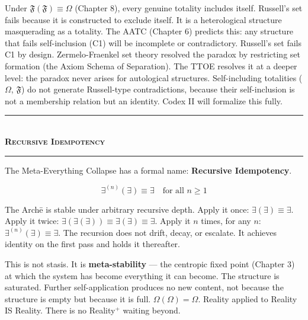 \documentclass[10pt, openany, oneside]{book}
\renewcommand{\normalsize}{\fontsize{10}{13}\selectfont}
\begin{document}
Under $\mathfrak{F}(\mathfrak{F}) \equiv \Omega$ (Chapter 8), every genuine totality includes itself. Russell's set fails because it is constructed to exclude itself. It is a heterological structure masquerading as a totality. The AATC (Chapter 6) predicts this: any structure that fails self-inclusion (C1) will be incomplete or contradictory. Russell's set fails C1 by design. Zermelo-Fraenkel set theory resolved the paradox by restricting set formation (the Axiom Schema of Separation). The TTOE resolves it at a deeper level: the paradox never arises for autological structures. Self-including totalities ($\Omega$, $\mathfrak{F}$) do not generate Russell-type contradictions, because their self-inclusion is not a membership relation but an identity. Codex II will formalize this fully.

\vspace{1.5em}


\begin{center}
    \rule{0.3\textwidth}{0.4pt}\\[0.5em]
    {\normalsize\bfseries\scshape Recursive Idempotency}\\[0.3em]
    \rule{0.3\textwidth}{0.4pt}
\end{center}

\vspace{1em}

\noindent The Meta-Everything Collapse has a formal name: \textbf{Recursive Idempotency}.

$$\exists^{(n)}(\exists) \equiv \exists \quad \text{for all } n \geq 1$$

The Arch\={e} is stable under arbitrary recursive depth. Apply it once: $\exists(\exists) \equiv \exists$. Apply it twice: $\exists(\exists(\exists)) \equiv \exists(\exists) \equiv \exists$. Apply it $n$ times, for any $n$: $\exists^{(n)}(\exists) \equiv \exists$. The recursion does not drift, decay, or escalate. It achieves identity on the first pass and holds it thereafter.

This is not stasis. It is \textbf{meta-stability} --- the centropic fixed point (Chapter 3) at which the system has become everything it can become. The structure is saturated. Further self-application produces no new content, not because the structure is empty but because it is full. $\Omega(\Omega) = \Omega$. Reality applied to Reality IS Reality. There is no Reality$^+$ waiting beyond.
\end{document}
